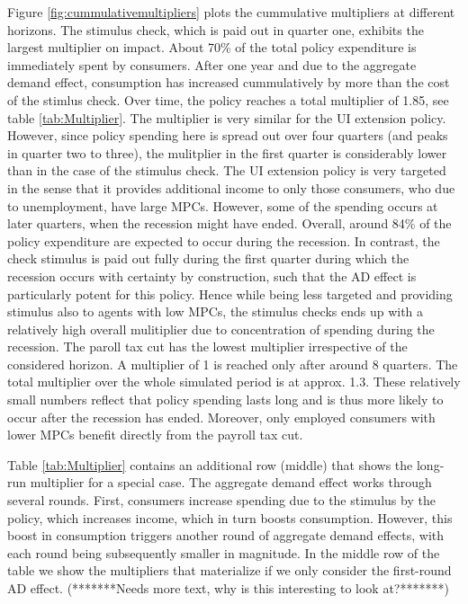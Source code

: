 \documentclass[../HAFiscal]{subfiles}
\begin{document}
Figure \ref{fig:cummulativemultipliers} plots the cummulative multipliers at different horizons. The stimulus check, which is paid out in quarter one, exhibits the largest multiplier on impact. About 70\% of the total policy expenditure is immediately spent by consumers. After one year and due to the aggregate demand effect, consumption has increased cummulatively by more than the cost of the stimlus check. Over time, the policy reaches a total multiplier of 1.85, see table \ref{tab:Multiplier}.
The multiplier is very similar for the UI extension policy. However, since policy spending here is spread out over four quarters (and peaks in quarter two to three), the mulitplier in the first quarter is considerably lower than in the case of the stimulus check. 
The UI extension policy is very targeted in the sense that it provides additional income to only those consumers, who due to unemployment, have large MPCs. However, some of the spending occurs at later quarters, when the recession might have ended. Overall, around 84\% of the policy expenditure are expected to occur during the recession. In contrast, the check stimulus is paid out fully during the first quarter during which the recession occurs with certainty by construction, such that the AD effect is particularly potent for this policy. Hence while being less targeted and providing stimulus also to agents with low MPCs, the stimulus checks ends up with a relatively high overall mulitiplier due to concentration of spending during the recession.
The paroll tax cut has the lowest multiplier irrespective of the considered horizon. A multiplier of 1 is reached only after around 8 quarters. The total multiplier over the whole simulated period is at approx. 1.3. These relatively small numbers reflect that policy spending lasts long and is thus more likely to occur after the recession has ended. Moreover, only employed consumers with lower MPCs benefit directly from the payroll tax cut. 

Table \ref{tab:Multiplier} contains an additional row (middle) that shows the long-run multiplier for a special case. The aggregate demand effect works through several rounds. First, consumers increase spending due to the stimulus by the policy, which increases income, which in turn boosts consumption. However, this boost in consumption triggers another round of aggregate demand effects, with each round being subsequently smaller in magnitude. In the middle row of the table we show the multipliers that materialize if we only consider the first-round AD effect. (*******Needs more text, why is this interesting to look at?*******)
\end{document}
